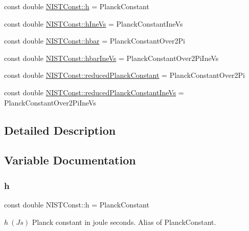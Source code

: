 \begin{DoxyCompactItemize}
\item 
const double \hyperlink{group___planck_constant_ga772638524d12d0e8a63abb25441f87a9}{N\+I\+S\+T\+Const\+::h} = Planck\+Constant
\item 
const double \hyperlink{group___planck_constant_gabdd6f21b3e5325e4df4a021ee6b6a506}{N\+I\+S\+T\+Const\+::h\+Ine\+Vs} = Planck\+Constant\+Ine\+Vs
\item 
const double \hyperlink{group___planck_constant_gaec21867afdeb1950b150e667513cd842}{N\+I\+S\+T\+Const\+::hbar} = Planck\+Constant\+Over2\+Pi
\item 
const double \hyperlink{group___planck_constant_gacbb39d7d0090ed14cb725a1d6eaa3fd3}{N\+I\+S\+T\+Const\+::hbar\+Ine\+Vs} = Planck\+Constant\+Over2\+Pi\+Ine\+Vs
\item 
const double \hyperlink{group___planck_constant_ga91e80f15330603015f6f8f8e8f49c926}{N\+I\+S\+T\+Const\+::reduced\+Planck\+Constant} = Planck\+Constant\+Over2\+Pi
\item 
const double \hyperlink{group___planck_constant_gab9efdc081c1c1a03ca7a233d1589b1d8}{N\+I\+S\+T\+Const\+::reduced\+Planck\+Constant\+Ine\+Vs} = Planck\+Constant\+Over2\+Pi\+Ine\+Vs
\end{DoxyCompactItemize}


\subsection{Detailed Description}


\subsection{Variable Documentation}
\mbox{\label{group___planck_constant_ga772638524d12d0e8a63abb25441f87a9}} 
\subsubsection{\texorpdfstring{h}{h}}
{\footnotesize\ttfamily const double N\+I\+S\+T\+Const\+::h = Planck\+Constant}

$h \ (J s)$ Planck constant in joule seconds. Alias of Planck\+Constant. \mbox{\label{group___planck_constant_gaec21867afdeb1950b150e667513cd842}} 
